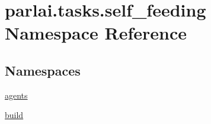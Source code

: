 \hypertarget{namespaceparlai_1_1tasks_1_1self__feeding}{}\section{parlai.\+tasks.\+self\+\_\+feeding Namespace Reference}
\label{namespaceparlai_1_1tasks_1_1self__feeding}
\subsection*{Namespaces}
\begin{DoxyCompactItemize}
\item 
 \hyperlink{namespaceparlai_1_1tasks_1_1self__feeding_1_1agents}{agents}
\item 
 \hyperlink{namespaceparlai_1_1tasks_1_1self__feeding_1_1build}{build}
\end{DoxyCompactItemize}
